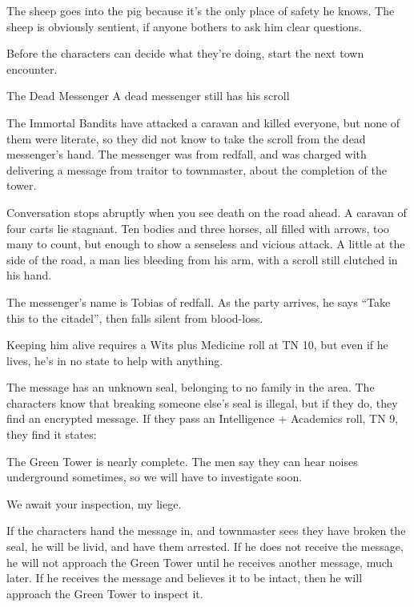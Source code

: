 \begin{multicols}{2}
The sheep goes into the \gls{pig} because it's the only place of safety he knows.  The sheep is obviously sentient, if anyone bothers to ask him clear questions.

Before the characters can decide what they're doing, start the next town encounter.

{The Dead Messenger}%
{A dead messenger still has his scroll}%

The Immortal Bandits have attacked a caravan and killed everyone, but none of them were literate, so they did not know to take the scroll from the dead messenger's hand.
The messenger was from \gls{redfall}, and was charged with delivering a message from \gls{traitor} to \gls{townmaster}, about the completion of the tower.

\begin{boxtext}

	Conversation stops abruptly when you see death on the road ahead.
	A caravan of four carts lie stagnant.
	Ten bodies and three horses, all filled with arrows, too many to count, but enough to show a senseless and vicious attack.
	A little at the side of the road, a man lies bleeding from his arm, with a scroll still clutched in his hand.

\end{boxtext}

The messenger's name is Tobias of \gls{redfall}.
As the party arrives, he says ``Take this to the citadel'', then falls silent from blood-loss.

Keeping him alive requires a Wits plus Medicine roll at TN 10, but even if he lives, he's in no state to help with anything.

The message has an unknown seal, belonging to no family in the area.
The characters know that breaking someone else's seal is illegal, but if they do, they find an encrypted message.
If they pass an Intelligence + Academics roll, TN 9, they find it states:

\begin{speechtext}

	The Green Tower is nearly complete.
	The men say they can hear noises underground sometimes, so we will have to investigate soon.

	We await your inspection, my liege.

\end{speechtext}

If the characters hand the message in, and \gls{townmaster} sees they have broken the seal, he will be livid, and have them arrested.
If he does not receive the message, he will not approach the Green Tower until he receives another message, much later.
If he receives the message and believes it to be intact, then he will approach the Green Tower to inspect it.


\end{multicols}
